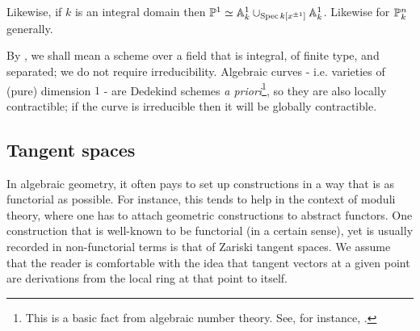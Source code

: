             \begin{example}
                Likewise, if $k$ is an integral domain then $\P^1 \cong \A^1_k \cup_{\Spec k[x^{\pm 1}]} \A^1_k$. Likewise for $\P^n_k$ generally.
            \end{example}
            \begin{example}
                By , we shall mean a scheme over a field that is integral, of finite type, and separated; we do not require irreducibility. Algebraic curves - i.e. varieties of (pure) dimension $1$ - are Dedekind schemes \textit{a priori}\footnote{This is a basic fact from algebraic number theory. See, for instance, \cite{neukirch_2010_algebraic_number_theory}.}, so they are also locally contractible; if the curve is irreducible then it will be globally contractible.
            \end{example}

        \subsection{Tangent spaces}
            In algebraic geometry, it often pays to set up constructions in a way that is as functorial as possible. For instance, this tends to help in the context of moduli theory, where one has to attach geometric constructions to abstract functors. One construction that is well-known to be functorial (in a certain sense), yet is usually recorded in non-functorial terms is that of Zariski tangent spaces. We assume that the reader is comfortable with the idea that tangent vectors at a given point are derivations from the local ring at that point to itself.  
        
